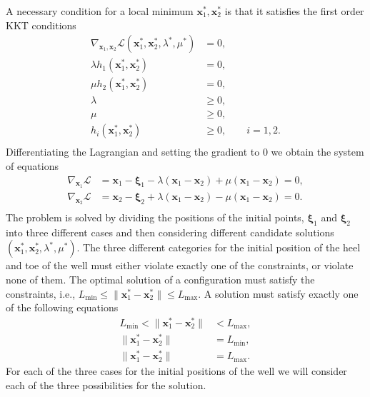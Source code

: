 A necessary condition for a local minimum $\textbf{x}_1^*, \textbf{x}_2^*$ is that 
it satisfies the first order KKT conditions
%
\begin{equation}
\begin{aligned}
\nabla_{\textbf{x}_1,\textbf{x}_2} \mathcal{L} (\textbf{x}_1^*, \textbf{x}_2^*, \lambda^*, \mu^*) &= 0, \\
\lambda h_1(\textbf{x}_1^*, \textbf{x}_2^*) &= 0,\\
\mu h_2(\textbf{x}_1^*, \textbf{x}_2^*) &= 0,\\
\lambda &\geq 0,\\
\mu &\geq 0,\\
h_i(\textbf{x}_1^*, \textbf{x}_2^*) &\geq 0, \qquad  i=1,2. \\
\end{aligned}
\end{equation}
%
Differentiating the Lagrangian and setting the gradient to 0 we obtain the system of equations
\begin{equation}
\begin{aligned}
\nabla_{\textbf{x}_1} \mathcal{L} &= \textbf{x}_1 - \boldsymbol{\xi}_1 - \lambda ( \textbf{x}_1 - \textbf{x}_2 ) + \mu ( \textbf{x}_1 - \textbf{x}_2 ) = 0, \\
\nabla_{\textbf{x}_2} \mathcal{L} &= \textbf{x}_2 - \boldsymbol{\xi}_2 + \lambda ( \textbf{x}_1 - \textbf{x}_2 ) - \mu ( \textbf{x}_1 - \textbf{x}_2 ) = 0. \\
\end{aligned}
\label{eq:gradients}
\end{equation}
%
%
The problem is solved by dividing the positions of the initial points, $\boldsymbol{\xi}_1 $ 
and $\boldsymbol{\xi}_2$ into three different cases and then considering different candidate 
solutions $(\textbf{x}_1^*, \textbf{x}_2^*, \lambda^*, \mu^*)$. The three different categories
for the initial position of the heel and toe of the well must either violate exactly one of the
constraints, or violate none of them. The optimal solution of a configuration must satisfy the
constraints, i.e., $L_{\min} \leq \| \textbf{x}_1^* - \textbf{x}_2^* \| \leq L_{\max}$. A solution
must satisfy exactly one of the following equations
%
\begin{equation}
\begin{aligned}
L_{\min} < \| \textbf{x}_1^* - \textbf{x}_2^* \| &< L_{\max}, \\
\| \textbf{x}_1^* - \textbf{x}_2^* \| &= L_{\min}, \\
\| \textbf{x}_1^* - \textbf{x}_2^* \| &= L_{\max}.
\label{eq:intercategories}
\end{aligned}
\end{equation}
%
For each of the three cases for the initial positions of the well we will
consider each of the three possibilities for the solution.
%

